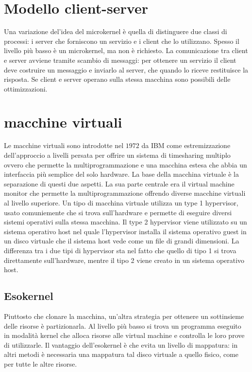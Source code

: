 \section{Modello client-server}
Una variazione del'idea del microkernel \`e quella di distinguere due classi di processi: i server che forniscono un servizio e i client che lo utilizzano. Spesso il livello pi\`u basso
\`e un microkernel, ma non \`e richiesto. La comunicazione tra client e server avviene tramite scambio di messaggi: per ottenere un servizio il client deve costruire un messaggio e 
inviarlo al server, che quando lo riceve restituisce la risposta. Se client e server operano sulla stessa macchina sono possibili delle ottimizzazioni.  
\section{macchine virtuali}
Le macchine virtuali sono introdotte nel $1972$ da IBM come estremizzazione dell'approccio a livelli persata per offrire un sistema di timesharing multiplo ovvero che permette la
multiprogrammazione e una macchina estesa che abbia un interfaccia pi\`u semplice del solo hardware. La base della macchina virtuale \`e la separazione di questi due aspetti. La sua parte
centrale era il virtual machine monitor che permette la multiprogrammazione offrendo diverse macchine virtuali al livello superiore. Un tipo di macchina virtuale utilizza un type 1 
hypervisor, usato comuniemente che si trova sull'hardware e permette di eseguire diversi sistemi operativi sulla stessa macchina. Il type 2 hypervisor viene utilizzato su un sistema 
operativo host nel quale l'hypervisor installa il sistema operativo guest in un disco virtuale che il sistema host vede come un file di grandi dimensioni. La differenza tra i due tipi
di hypervisor sta nel fatto che quello di tipo 1 si trova direttamente sull'hardware, mentre il tipo 2 viene creato in un sistema operativo host.
\subsection{Esokernel}
Piuttosto che clonare la macchina, un'altra strategia per ottenere un sottinsieme delle risorse \`e partizionarla. Al livello pi\`u basso si trova un programma eseguito in modalit\`a
kernel che alloca risorse alle virtual machine e controlla le loro prove di utilizzarle. Il vantaggio dell'esokernel \`e che evita un livello di mappatura: in altri metodi \`e necessaria
una mappatura tal disco virtuale a quello fisico, come per tutte le altre risorse. 

